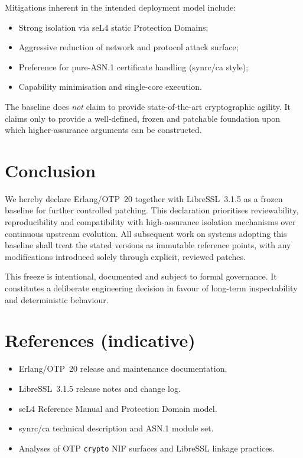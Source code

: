 \documentclass{article}
\begin{document}
Mitigations inherent in the intended deployment model include:

\begin{itemize}
  \item Strong isolation via seL4 static Protection Domains;
  \item Aggressive reduction of network and protocol attack surface;
  \item Preference for pure-ASN.1 certificate handling (synrc/ca style);
  \item Capability minimisation and single-core execution.
\end{itemize}

The baseline does \emph{not} claim to provide state-of-the-art cryptographic agility.
It claims only to provide a well-defined, frozen and patchable foundation upon which
higher-assurance arguments can be constructed.

\section{Conclusion}
\label{sec:conclusion}

We hereby declare Erlang/OTP~20 together with LibreSSL~3.1.5 as a frozen baseline for further
controlled patching. This declaration prioritises reviewability, reproducibility and compatibility
with high-assurance isolation mechanisms over continuous upstream evolution. All subsequent work
on systems adopting this baseline shall treat the stated versions as immutable reference points,
with any modifications introduced solely through explicit, reviewed patches.

This freeze is intentional, documented and subject to formal governance. It constitutes a deliberate
engineering decision in favour of long-term inspectability and deterministic behaviour.

\section*{References (indicative)}

\begin{itemize}
  \item Erlang/OTP~20 release and maintenance documentation.
  \item LibreSSL~3.1.5 release notes and change log.
  \item seL4 Reference Manual and Protection Domain model.
  \item synrc/ca technical description and ASN.1 module set.
  \item Analyses of OTP \texttt{crypto} NIF surfaces and LibreSSL linkage practices.
\end{itemize}
\end{document}
